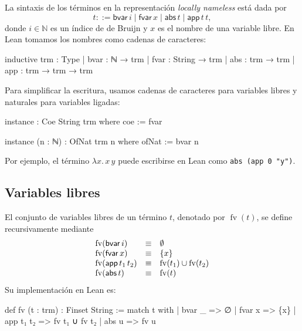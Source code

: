 \documentclass[
  spanish,
  letterpaper,
  DIV=11,
  numbers=noendperiod]{scrreprt}
\newenvironment{Shaded}{\begin{snugshade}}{\end{snugshade}}
\newcommand{\KeywordTok}[1]{\textcolor[rgb]{0.00,0.23,0.31}{\textbf{#1}}}
\newcommand{\NormalTok}[1]{\textcolor[rgb]{0.00,0.23,0.31}{#1}}
\renewcommand{\NormalTok}[1]{\textcolor[HTML]{000000}{#1}}
\renewcommand{\KeywordTok}[1]{\textcolor[HTML]{0000FF}{#1}}
\let\oldgreater\textgreater
\renewcommand{\textgreater}{\null\oldgreater}%
\theoremstyle{remark}
\begin{document}
La sintaxis de los términos en la representación \emph{locally nameless}
está dada por \[
t ::=
\mathsf{bvar}\,i \mid
\mathsf{fvar}\,x \mid
\mathsf{abs}\,t \mid
\mathsf{app}\,t\,t,
\] donde \(i\in\mathbb{N}\) es un índice de de Bruijn y \(x\) es el
nombre de una variable libre. En Lean tomamos los nombres como cadenas
de caracteres:

\begin{Shaded}
\begin{Highlighting}[]
\NormalTok{inductive trm : }\KeywordTok{Type}
\NormalTok{  | bvar : ℕ → trm}
\NormalTok{  | fvar : String → trm}
\NormalTok{  | abs  : trm → trm}
\NormalTok{  | app  : trm → trm → trm}
\end{Highlighting}
\end{Shaded}

Para simplificar la escritura, usamos cadenas de caracteres para
variables libres y naturales para variables ligadas:

\begin{Shaded}
\begin{Highlighting}[]
\NormalTok{instance : Coe String trm where}
\NormalTok{  coe := fvar}

\NormalTok{instance (n : ℕ) : OfNat trm n where}
\NormalTok{  ofNat := bvar n}
\end{Highlighting}
\end{Shaded}

Por ejemplo, el término \(\lambda x. \, x \, y\) puede escribirse en
Lean como \texttt{abs\ (app\ 0\ "y")}.

\subsection{Variables libres}\label{variables-libres}

El conjunto de variables libres de un término \(t\), denotado por
\(\operatorname{fv} (t)\), se define recursivamente mediante \[
\begin{array}{l c l}
\operatorname{fv}(\mathsf{bvar}\, i) & \equiv & \emptyset \\ 
\operatorname{fv}(\mathsf{fvar}\, x) & \equiv & \{x\} \\ 
\operatorname{fv}(\mathsf{app}\, t_1\, t_2) & \equiv & \operatorname{fv}(t_1) \cup \operatorname{fv}(t_2) \\ 
\operatorname{fv}(\mathsf{abs}\, t) & \equiv & \operatorname{fv}(t)
\end{array}
\] Su implementación en Lean es:

\begin{Shaded}
\begin{Highlighting}[]
\KeywordTok{def}\NormalTok{ fv (t : trm) : Finset String :=}
  \KeywordTok{match}\NormalTok{ t }\KeywordTok{with}
\NormalTok{  | bvar \_    =\textgreater{} ∅}
\NormalTok{  | fvar x    =\textgreater{} \{x\}}
\NormalTok{  | app t₁ t₂ =\textgreater{} fv t₁ ∪ fv t₂}
\NormalTok{  | abs u     =\textgreater{} fv u}
\end{Highlighting}
\end{Shaded}
\end{document}
